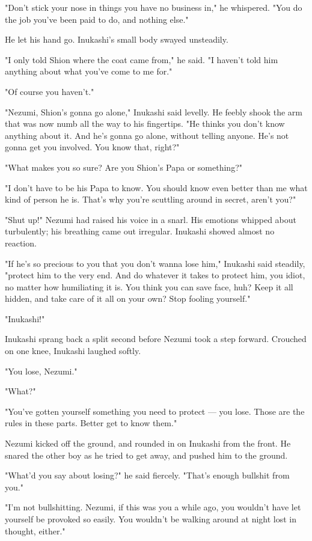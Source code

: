 "Don't stick your nose in things you have no business in," he whispered.
"You do the job you've been paid to do, and nothing else."

He let his hand go. Inukashi's small body swayed unsteadily.

"I only told Shion where the coat came from," he said. "I haven't told
him anything about what you've come to me for."

"Of course you haven't."

"Nezumi, Shion's gonna go alone," Inukashi said levelly. He feebly shook
the arm that was now numb all the way to his fingertips. "He thinks you
don't know anything about it. And he's gonna go alone, without telling
anyone. He's not gonna get you involved. You know that, right?"

"What makes you so sure? Are you Shion's Papa or something?"

"I don't have to be his Papa to know. You should know even better than
me what kind of person he is. That's why you're scuttling around in
secret, aren't you?"

"Shut up!" Nezumi had raised his voice in a snarl. His emotions whipped
about turbulently; his breathing came out irregular. Inukashi showed
almost no reaction.

"If he's so precious to you that you don't wanna lose him," Inukashi
said steadily, "protect him to the very end. And do whatever it takes to
protect him, you idiot, no matter how humiliating it is. You think you
can save face, huh? Keep it all hidden, and take care of it all on your
own? Stop fooling yourself."

"Inukashi!"

Inukashi sprang back a split second before Nezumi took a step forward.
Crouched on one knee, Inukashi laughed softly.

"You lose, Nezumi."

"What?"

"You've gotten yourself something you need to protect --- you lose. Those
are the rules in these parts. Better get to know them."

Nezumi kicked off the ground, and rounded in on Inukashi from the front.
He snared the other boy as he tried to get away, and pushed him to the
ground.

"What'd you say about losing?" he said fiercely. "That's enough bullshit
from you."

"I'm not bullshitting. Nezumi, if this was you a while ago, you wouldn't
have let yourself be provoked so easily. You wouldn't be walking around
at night lost in thought, either."

